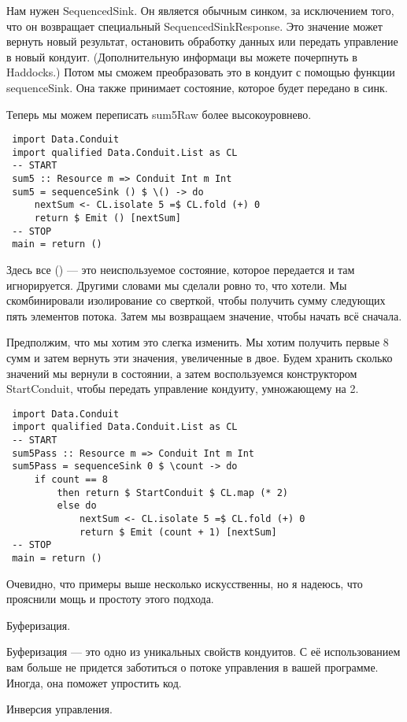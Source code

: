 \begin{verbaim}
Нам нужен SequencedSink. Он является обычным синком, за исключением того, что он возвращает специальный SequencedSinkResponse. Это значение может вернуть новый результат, остановить обработку данных или передать управление в новый кондуит. (Дополнительную информаци вы можете почерпнуть в Haddocks.) Потом мы сможем преобразовать это в кондуит с помощью функции sequenceSink. Она также принимает состояние, которое будет передано в синк.
 
 Теперь мы можем переписать sum5Raw более высокоуровнево.
 \begin{lstlisting}
 import Data.Conduit
 import qualified Data.Conduit.List as CL
 -- START
 sum5 :: Resource m => Conduit Int m Int
 sum5 = sequenceSink () $ \() -> do
     nextSum <- CL.isolate 5 =$ CL.fold (+) 0
     return $ Emit () [nextSum]
 -- STOP
 main = return ()
 \end{lstlisting}
Здесь все () --- это  неиспользуемое состояние, которое передается и там игнорируется. Другими словами мы сделали ровно то, что хотели. Мы скомбинировали изолирование со сверткой, чтобы получить сумму следующих пять элементов потока. Затем мы возвращаем значение, чтобы начать всё сначала.
 
Предполжим, что мы хотим это слегка изменить. Мы хотим получить первые 8 сумм и затем вернуть эти значения, увеличенные в двое. Будем хранить сколько значений мы вернули в состоянии, а затем воспользуемся конструктором StartConduit, чтобы передать управление кондуиту, умножающему на 2.
\begin{lstlisting}
 import Data.Conduit
 import qualified Data.Conduit.List as CL
 -- START
 sum5Pass :: Resource m => Conduit Int m Int
 sum5Pass = sequenceSink 0 $ \count -> do
     if count == 8
         then return $ StartConduit $ CL.map (* 2)
         else do
             nextSum <- CL.isolate 5 =$ CL.fold (+) 0
             return $ Emit (count + 1) [nextSum]
 -- STOP
 main = return ()
\end{lstlisting}
Очевидно, что примеры выше несколько искусственны, но я надеюсь, что прояснили мощь и простоту этого подхода. 
 
Буферизация.

Буферизация --- это одно из уникальных свойств кондуитов. С её использованием вам больше не придется заботиться о потоке управления в вашей программе.
Иногда, она поможет упростить код.


Инверсия управления.


\end{verbaim}
